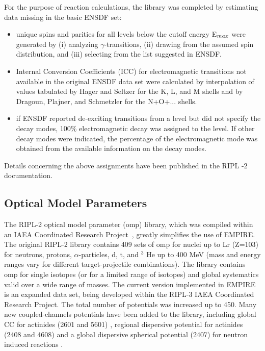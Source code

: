 For the purpose of reaction calculations, the library was completed by
estimating data missing in the basic ENSDF set:

\begin{itemize}
\item unique spins and parities for all levels below the cutoff energy E$_{{%
max}}$ were generated by (i) analyzing $\gamma$-transitions, (ii) drawing
from the assumed spin distribution, and (iii) selecting from the list
suggested in ENSDF.

\item Internal Conversion Coefficients (ICC) for electromagnetic transitions
not available in the original ENSDF data set were calculated by
interpolation of values tabulated by Hager and Seltzer for the K, L, and M
shells and by Dragoun, Plajner, and Schmetzler for the N+O+... shells.

\item if ENSDF reported de-exciting transitions from a level but did not
specify the decay modes, 100\% electromagnetic decay was assigned to the
level. If other decay modes were indicated, the percentage of the
electromagnetic mode was obtained from the available information on the
decay modes.
\end{itemize}

Details concerning the above assignments have been published in the RIPL%
-2 documentation.

\subsection{Optical Model Parameters\label{sec:RIPLomp}}

The RIPL-2 optical model parameter (omp) library, which was compiled within
an IAEA Coordinated Research Project~\cite{RIPL2}, greatly simplifies
the use of
EMPIRE. The original RIPL-2 library contains 409 sets of omp for nuclei
up to Lr (Z=103) for neutrons, protons, $\alpha $-particles, d, t, and $^{3}$%
He up to 400 MeV (mass and energy ranges vary for different
target-projectile combinations). The library contains omp for single
isotopes (or for a limited range of isotopes) and global systematics valid
over a wide range of masses. The current version implemented in EMPIRE is an
expanded data set, being developed within the RIPL-3 IAEA Coordinated
Research Project. The total number of potentials was increased up to 450.
Many new coupled-channels potentials have been added to the library,
including global CC for actinides (2601 and 5601) \cite{sochle04}, regional
dispersive potential for actinides (2408 and 4608) and a global dispersive
spherical potential (2407) for neutron induced reactions \cite{moro04}.

